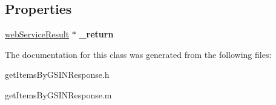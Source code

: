 \subsection*{Properties}
\begin{DoxyCompactItemize}
\item 
\hypertarget{interfaceget_items_by_g_s_i_n_response_a5080b8212846536033227f81b6627025}{}\hyperlink{interfaceweb_service_result}{web\+Service\+Result} $\ast$ {\bfseries \+\_\+return}\label{interfaceget_items_by_g_s_i_n_response_a5080b8212846536033227f81b6627025}

\end{DoxyCompactItemize}


The documentation for this class was generated from the following files\+:\begin{DoxyCompactItemize}
\item 
get\+Items\+By\+G\+S\+I\+N\+Response.\+h\item 
get\+Items\+By\+G\+S\+I\+N\+Response.\+m\end{DoxyCompactItemize}
